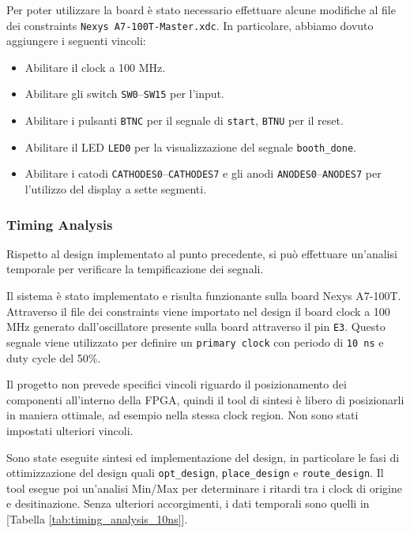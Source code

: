 Per poter utilizzare la board è stato necessario effettuare alcune modifiche al file dei constraints \texttt{Nexys A7-100T-Master.xdc}. In particolare, abbiamo dovuto aggiungere i seguenti vincoli:
\begin{itemize}
    \item Abilitare il clock a 100 MHz.
    \item Abilitare gli switch \texttt{SW0}--\texttt{SW15} per l’input.
    \item Abilitare i pulsanti \texttt{BTNC} per il segnale di \texttt{start}, \texttt{BTNU} per il reset.
    \item Abilitare il LED \texttt{LED0} per la visualizzazione del segnale \texttt{booth\_done}.
    \item Abilitare i catodi \texttt{CATHODES0}--\texttt{CATHODES7} e gli anodi \texttt{ANODES0}--\texttt{ANODES7} per l'utilizzo del display a sette segmenti.
\end{itemize}

\subsubsection{Timing Analysis}
Rispetto al design implementato al punto precedente, si può effettuare un'analisi temporale per verificare la tempificazione dei segnali.

Il sistema è stato implementato e risulta funzionante sulla board Nexys A7-100T. Attraverso il file dei constraints viene importato nel design il board clock a 100 MHz generato dall'oscillatore presente sulla board attraverso il pin \texttt{E3}. Questo segnale viene utilizzato per definire un \texttt{primary clock} con periodo di \texttt{10 ns} e duty cycle del 50\%.

Il progetto non prevede specifici vincoli riguardo il posizionamento dei componenti all'interno della FPGA, quindi il tool di sintesi è libero di posizionarli in maniera ottimale, ad esempio nella stessa clock region. Non sono stati impostati ulteriori vincoli.

Sono state eseguite sintesi ed implementazione del design, in particolare le fasi di ottimizzazione del design quali \texttt{opt\_design}, \texttt{place\_design} e \texttt{route\_design}. Il tool esegue poi un'analisi Min/Max per determinare i ritardi tra i clock di origine e desitinazione. Senza ulteriori accorgimenti, i dati temporali sono quelli in [Tabella \ref{tab:timing_analysis_10ns}].

